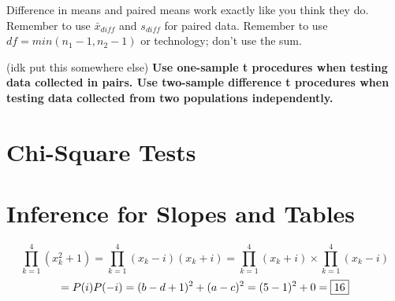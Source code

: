 \documentclass[12pt, a4paper]{article}
\theoremstyle{definition}
\begin{document}
Difference in means and paired means work exactly like you think they do.
Remember to use $\bar{x}_{diff}$ and $s_{diff}$ for paired data.
Remember to use $df = min(n_1 - 1, n_2 - 1)$ or technology; don't use the sum.

(idk put this somewhere else) \textbf{Use one-sample t procedures when testing data collected in pairs. Use two-sample difference t procedures when testing data collected from two populations independently.}
\newpage

\section{Chi-Square Tests}

\newpage

\section{Inference for Slopes and Tables}

\[\prod_{k=1}^{4}(x^2_k+1) = \prod_{k=1}^{4}(x_k-i)(x_k+i) = \prod_{k=1}^{4}(x_k + i) \times \prod_{k=1}^4(x_k - i)\]
\[= P(i)P(-i) = (b - d + 1)^2 + (a - c)^2 = (5 - 1)^2 + 0 = \fbox{16}\]
\end{document}
